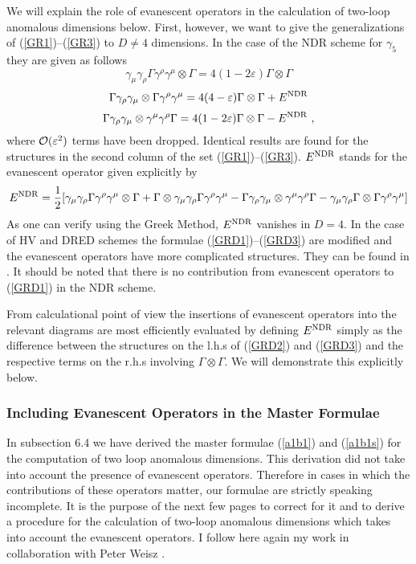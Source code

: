 \documentclass[12pt,rotate]{article}
\newcommand{\be}{\begin{equation}}
\newcommand{\ee}{\end{equation}}
\newcommand{\ord}{{\cal O}}
\begin{document}
\begin{itemize}
\begin{itemize}
We will explain the role of evanescent operators in the calculation
of two-loop anomalous dimensions below. First, however, we want to
give the generalizations of (\ref{GR1})--(\ref{GR3}) to $D\not=4$ 
dimensions. In the case of the NDR scheme for $\gamma_5$ they are 
given as follows \cite{WEISZ}
\be\label{GRD1}
\gamma_\mu\gamma_\rho\Gamma\gamma^\rho\gamma^\mu \otimes \Gamma
=4 (1-2\varepsilon)\Gamma\otimes\Gamma
\ee
\be\label{GRD2}
\Gamma\gamma_\rho\gamma_\mu\otimes\Gamma\gamma^\rho\gamma^\mu 
=4(4-\varepsilon) \Gamma\otimes\Gamma+E^{\rm NDR}
\ee
\be\label{GRD3}
\Gamma\gamma_\rho\gamma_\mu\otimes\gamma^\mu\gamma^\rho\Gamma 
=4 (1-2\varepsilon) \Gamma\otimes\Gamma-E^{\rm NDR}~,
\ee
where $\ord(\varepsilon^2)$ terms have been dropped.
Identical results are found for the structures in the second column
of the set (\ref{GR1})--(\ref{GR3}). 
$E^{\rm NDR}$ stands for the evanescent operator
given explicitly by
\be\label{EVAN}
E^{\rm NDR}=\frac{1}{2}
[\gamma_\mu\gamma_\rho\Gamma\gamma^\rho\gamma^\mu\otimes\Gamma
+\Gamma\otimes\gamma_\mu\gamma_\rho\Gamma\gamma^\rho\gamma^\mu
-\Gamma\gamma_\rho\gamma_\mu\otimes\gamma^\mu\gamma^\rho\Gamma
-\gamma_\mu\gamma_\rho\Gamma\otimes\Gamma\gamma^\rho\gamma^\mu]
\ee
As one can verify using the Greek Method, $E^{\rm NDR}$ vanishes in
$D=4$. In the case of HV and DRED schemes the formulae 
(\ref{GRD1})--(\ref{GRD3}) 
are modified and the evanescent operators have more
complicated structures. They can be found in \cite{WEISZ}.
It should be noted that there is no contribution from evanescent
operators to (\ref{GRD1}) in the NDR scheme. 

From calculational point of view the insertions of evanescent operators
into the relevant diagrams are most efficiently evaluated by defining
$E^{\rm NDR}$ simply as the difference between the structures on the
l.h.s of (\ref{GRD2}) and (\ref{GRD3}) and the respective terms on the
r.h.s involving $\Gamma\otimes\Gamma$. We will demonstrate this 
explicitly below.  

\subsubsection{Including Evanescent Operators in the Master
Formulae}
In subsection 6.4 we have derived the master formulae (\ref{a1b1}) and 
(\ref{a1b1s}) for
the computation of two loop anomalous dimensions. This derivation
did not take into account the presence of evanescent operators.
Therefore in cases in which the contributions of these operators
matter, our formulae are strictly speaking incomplete. It is the
purpose of the next few pages to correct for it and to derive
a procedure for the calculation of two-loop anomalous dimensions
which takes into account the evanescent operators. I follow here
again my work in collaboration with Peter Weisz \cite{WEISZ}.


\end{itemize}
\end{itemize}
\end{document}
